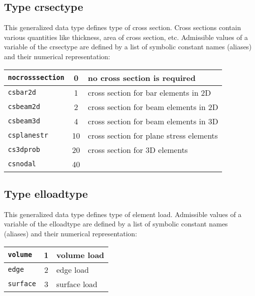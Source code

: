 \subsection{Type {\sf crsectype}}
\label{sectcrsectype}

This generalized data type defines type of cross section. Cross sections contain various quantities
like thickness, area of cross section, etc.
Admissible values of a variable of the {\sf crsectype} are defined by a list of symbolic constant names (aliases)
and their numerical representation:

\begin{center}
\begin{tabular}{|l|c|l|}
\hline
{\tt nocrosssection} & 0 & no cross section is required
\\ \hline
{\tt csbar2d} & 1 & cross section for bar elements in 2D
\\ \hline
{\tt csbeam2d} & 2 & cross section for beam elements in 2D
\\ \hline
{\tt csbeam3d} & 4 & cross section for beam elements in 3D
\\ \hline
{\tt csplanestr} & 10 & cross section for plane stress elements
\\ \hline
{\tt cs3dprob} & 20 & cross section for 3D elements
\\ \hline
{\tt csnodal} & 40 &
\\ \hline
\end{tabular}
\end{center}

\subsection{Type {\sf elloadtype}}
\label{sectelloadtype}

This generalized data type defines type of element load.
Admissible values of a variable of the {\sf elloadtype} are defined by a list of symbolic constant names (aliases)
and their numerical representation:

\begin{center}
\begin{tabular}{|l|c|l|}
\hline
{\tt volume} & 1 & volume load
\\ \hline
{\tt edge} & 2 & edge load
\\ \hline
{\tt surface} & 3 & surface load
\\ \hline
\end{tabular}
\end{center}

